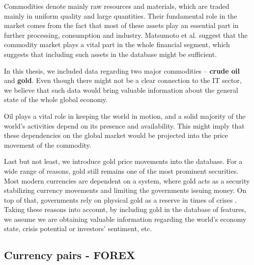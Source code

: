 Commodities denote mainly raw resources and materials, which are traded mainly in uniform quality and large quantities. Their fundamental role in the market
comes from the fact that most of these assets play an essential part in further processing, consumption and industry. Matsumoto et al. \cite{clanok3} suggest that the commodity
market plays a vital part in the whole financial segment, which suggests that including such assets in the database might be sufficient.
\par
In this thesis, we included data regarding two major commodities – \textbf{crude oil} and \textbf{gold}. Even though there might not be a clear
connection to the IT sector, we believe that such data would bring valuable information about the general state 
of the whole global economy.
\par
Oil plays a vital role in keeping the world in motion, and a solid majority of the world's activities depend on its presence and availability.
This might imply that these dependencies on the global market would be projected into the price movement of the commodity.
\par
Last but not least, we introduce gold price movements into the database. For a wide range of reasons, gold still remains one of the most
prominent securities. Most modern currencies are dependent on a system, where gold acts as a security stabilizing currency movements and limiting
the governments issuing money. On top of that, governments rely on physical gold as a reserve in times of crises \cite{gold}. Taking these reasons into account, 
by including gold in the database of features, we assume we are obtaining valuable information regarding the world's economy state, crisis potential or investors' sentiment, etc.

\subsection{Currency pairs - FOREX}

